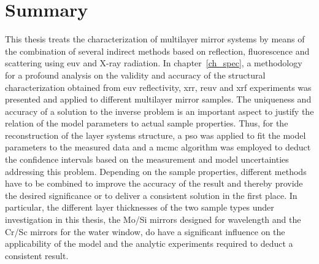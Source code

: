 \chapter{Summary} \label{ch_summary}
This thesis treats the characterization of multilayer mirror systems by means of the combination of several indirect methods based on reflection, fluorescence and scattering using \gls{euv} and X-ray radiation. In chapter~\ref{ch_spec}, a methodology for a profound analysis on the validity and accuracy of the structural characterization obtained from \glsdesc{euv} reflectivity, \glsdesc{xrr}, \glsdesc{reuv} and \glsdesc{xrf} experiments was presented and applied to different multilayer mirror samples. The uniqueness and accuracy of a solution to the inverse problem is an important aspect to justify the relation of the model parameters to actual sample properties. Thus, for the reconstruction of the layer systems structure, a \glsdesc{pso} was applied to fit the model parameters to the measured data and a \glsdesc{mcmc} algorithm was employed to deduct the confidence intervals based on the measurement and model uncertainties addressing this problem. Depending on the sample properties, different methods have to be combined to improve the accuracy of the result and thereby provide the desired significance or to deliver a consistent solution in the first place. In particular, the different layer thicknesses of the two sample types under investigation in this thesis, the Mo/Si mirrors designed for  wavelength and the Cr/Sc mirrors for the water window, do have a significant influence on the applicability of the model and the analytic experiments required to deduct a consistent result.

